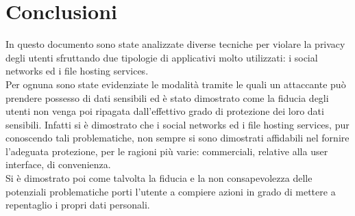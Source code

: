 \chapter{Conclusioni}
In questo documento sono state analizzate diverse tecniche per violare la privacy degli utenti sfruttando due tipologie di applicativi molto utilizzati: i social networks ed i file hosting services. \\
Per ognuna sono state evidenziate le modalità tramite le quali un attaccante può prendere possesso di dati sensibili ed è stato dimostrato come la fiducia degli utenti non venga poi ripagata dall'effettivo grado di protezione dei loro dati sensibili. Infatti si è dimostrato che i social networks ed i file hosting services, pur conoscendo tali problematiche, non sempre si sono dimostrati affidabili nel fornire l'adeguata protezione, per le ragioni più varie: commerciali, relative alla user interface, di convenienza.\\
Si è dimostrato poi come talvolta la fiducia e la non consapevolezza delle potenziali problematiche porti l'utente a compiere azioni in grado di mettere a repentaglio i propri dati personali.